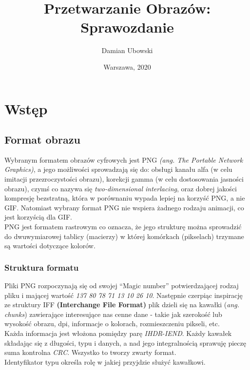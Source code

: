\documentclass[a4paper,12pt]{book}
\title{\Large{\textbf{Przetwarzanie Obrazów: Sprawozdanie}}}
\author{Damian Ubowski}
\date{Warszawa, 2020}
\begin{document}
\maketitle
\tableofcontents

\chapter{Wstęp}
\section{Format obrazu}
Wybranym formatem obrazów cyfrowych jest PNG \textit{(ang. The Portable Network Graphics)}, a jego możliwości sprowadzają się do: obsługi kanału alfa (w celu imitacji przezroczystości obrazu), korekcji gamma (w celu dostosowania jasności obrazu), czymś co nazywa się \textit{two-dimensional interlacing}, oraz dobrej jakości kompresję bezstratną, która w porównaniu wypada lepiej na korzyść PNG, a nie GIF. Natomiast wybrany format PNG nie wspiera żadnego rodzaju animacji, co jest korzyścią dla GIF. \\
PNG jest formatem rastrowym co oznacza, że jego strukturę można sprowadzić do dwuwymiarowej tablicy (macierzy) w której komórkach (pikselach) trzymane są wartości dotyczące kolorów. 

\subsection{Struktura formatu}
Pliki PNG rozpoczynają się od swojej ``Magic number'' potwierdzającej rodzaj pliku i mającej wartość \textit{137 80 78 71 13 10 26 10}. Następnie czerpiąc inspirację ze struktury IFF \textbf{(Interchange File Format)} plik dzieli się na kawałki (\textit{ang. chunks}) zawierające interesujące nas cenne dane - takie jak szerokość lub wysokość obrazu, dpi, informacje o kolorach, rozmieszczeniu pikseli, etc. \\
Każda informacja jest włożona pomiędzy parę \textit{IHDR}-\textit{IEND}. Każdy kawałek składając się z długości, typu i danych, a nad jego integralnością sprawuję pieczę suma kontrolna \textit{CRC}. Wszystko to tworzy zwarty format. \\
Identyfikator typu określa rolę w jakiej przyjdzie służyć kawałkowi. 
\end{document}

